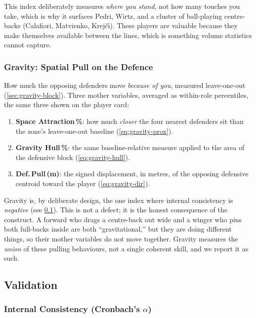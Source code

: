 \documentclass[12pt,a4paper]{article}
\begin{document}
This index deliberately measures \emph{where you stand}, not how many touches you take, which is why it surfaces Pedri, Wirtz, and a cluster of ball-playing centre-backs (Calafiori, Matvienko, Krej\v{c}\'{\i}). These players are valuable because they make themselves available between the lines, which is something volume statistics cannot capture.

\subsubsection{Gravity: Spatial Pull on the Defence}\label{sec:gravity}

How much the opposing defenders move \emph{because of you}, measured leave-one-out (\cref{sec:gravity-block}).
Three mother variables, averaged as within-role percentiles, the same three shown on the player card:

\begin{enumerate}
    \item \textbf{Space Attraction\,\%}: how much \emph{closer} the four nearest defenders sit than the zone's leave-one-out baseline (\cref{eq:gravity-prox}).
    \item \textbf{Gravity Hull\,\%}: the same baseline-relative measure applied to the area of the defensive block (\cref{eq:gravity-hull}).
    \item \textbf{Def.\,Pull\,(m)}: the signed displacement, in metres, of the opposing defensive centroid toward the player (\cref{eq:gravity-dir}).
\end{enumerate}

Gravity is, by deliberate design, the one index where internal consistency is \emph{negative} (see \cref{sec:h1-validation}).
This is not a defect; it is the honest consequence of the construct.
A forward who drags a centre-back out wide and a winger who pins both full-backs inside are both ``gravitational,'' but they are doing different things, so their mother variables do not move together.
Gravity measures the \emph{union} of these pulling behaviours, not a single coherent skill, and we report it as such.

\subsection{Validation}\label{sec:h1-validation}

\subsubsection[Internal Consistency (Cronbach's alpha)]{Internal Consistency (Cronbach's $\alpha$)}\label{sec:cronbach}
\end{document}
